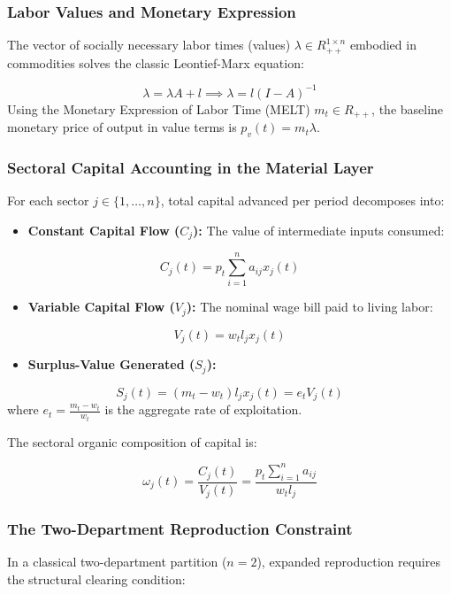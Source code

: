 \documentclass[11pt,letterpaper]{report}
\begin{document}
\subsubsection{Labor Values and Monetary Expression}
The vector of socially necessary labor times (values) $\lambda \in {R}_{++}^{1\times n}$ embodied in commodities solves the classic Leontief-Marx equation:

\[
\lambda = \lambda A + l \implies \lambda = l (I - A)^{-1}
\]
Using the Monetary Expression of Labor Time (MELT) ${m}_{t}\in {R}_{++}$, the baseline monetary price of output in value terms is ${p}_{v}(t)={m}_{t}\lambda$.

\subsubsection{Sectoral Capital Accounting in the Material Layer}
For each sector $j \in \{1, \dots, n\}$, total capital advanced per period decomposes into:

\begin{itemize}
\item \textbf{Constant Capital Flow (${C}_{j}$):} The value of intermediate inputs consumed:
\end{itemize}
\[
{C}_{j}(t)={p}_{t}\sum\limits_{i=1}^{n}{a}_{ij}{x}_{j}(t)
\]
\begin{itemize}
\item \textbf{Variable Capital Flow (${V}_{j}$):} The nominal wage bill paid to living labor:
\end{itemize}
\[
{V}_{j}(t)={w}_{t}{l}_{j}{x}_{j}(t)
\]
\begin{itemize}
\item \textbf{Surplus-Value Generated (${S}_{j}$):}
\end{itemize}
\[
{S}_{j}(t)=({m}_{t}-{w}_{t}){l}_{j}{x}_{j}(t)={e}_{t}{V}_{j}(t)
\]
where ${e}_{t}=\frac{{m}_{t}-{w}_{t}}{{w}_{t}}$ is the aggregate rate of exploitation.

The sectoral organic composition of capital is:

\[
{\omega }_{j}(t)=\frac{{C}_{j}(t)}{{V}_{j}(t)}=\frac{{p}_{t}\sum\limits_{i=1}^{n}{a}_{ij}}{{w}_{t}{l}_{j}}
\]
\subsubsection{The Two-Department Reproduction Constraint}
In a classical two-department partition ($n=2$), expanded reproduction requires the structural clearing condition:
\end{document}
